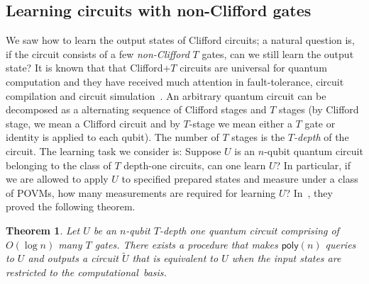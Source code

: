 \documentclass[11pt]{article}
\newtheorem{theorem}{Theorem}
\begin{document}
\subsection{Learning circuits with non-Clifford gates}
We saw how to learn the output states of Clifford circuits; a natural question is, if the circuit consists of a few \emph{non-Clifford} $T$ gates, can we still learn the output state?  It is known that that Clifford+$T$ circuits are universal for quantum computation and they have received much attention in fault-tolerance, circuit compilation and circuit simulation~\cite{BK98, FMM+12,KMM13, Sel15, RS16,BSS16, BG16,bravyi2019simulation}.  An arbitrary quantum circuit can be decomposed as a alternating sequence of Clifford stages and $T$ stages (by Clifford stage, we mean a Clifford circuit and by $T$-stage we mean either a $T$ gate or identity is applied to each qubit). The number of $T$ stages is  the \textit{$T$-depth} of the circuit. The learning task we consider is: Suppose $U$ is an $n$-qubit quantum circuit belonging to the class of $T$ depth-one circuits, can one learn $U$? In particular, if we are allowed to apply $U$ to specified prepared states and measure under a class of POVMs, how many measurements are required for learning $U$? In~\cite{lai2022learning}, they proved the following theorem.
\begin{theorem}
   Let $U$ be an $n$-qubit  $T$-depth one quantum circuit  comprising of $O(\log n)$ many $T$ gates. There exists a procedure that makes $\textsf{poly}(n)$ queries to $U$ and  outputs a circuit $\tilde{U}$  that is equivalent to $U$  when the input states are restricted to the computational~basis.
\end{theorem}
\end{document}
